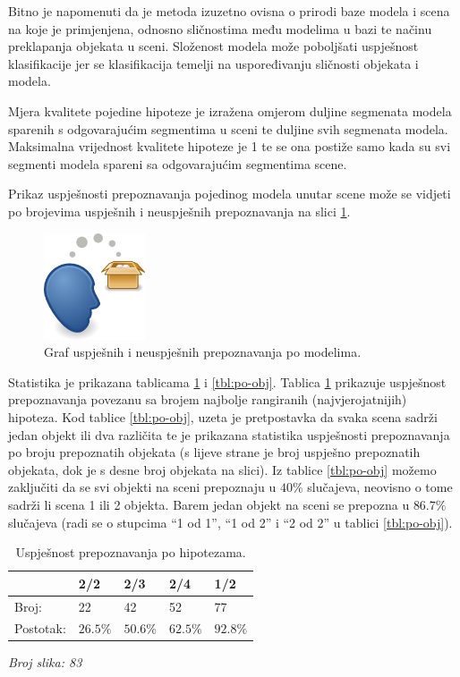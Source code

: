 \documentclass[lmodern, utf8, seminar, numeric]{fer}
\begin{document}
Bitno je napomenuti da je metoda izuzetno ovisna o prirodi baze modela i scena na koje je primjenjena, odnosno sličnostima među modelima u bazi te načinu preklapanja objekata u sceni. Složenost modela može poboljšati uspješnost klasifikacije jer se klasifikacija temelji na uspoređivanju sličnosti objekata i modela.

Mjera kvalitete pojedine hipoteze je izražena omjerom duljine segmenata modela sparenih s odgovarajućim segmentima u sceni te duljine svih segmenata modela. Maksimalna vrijednost kvalitete hipoteze je 1 te se ona postiže samo kada su svi segmenti modela spareni sa odgovarajućim segmentima scene.

Prikaz uspješnosti prepoznavanja pojedinog modela unutar scene može se vidjeti po brojevima uspješnih i neuspješnih prepoznavanja na slici \ref{fig:graf}.

\begin{figure}[htb]
\begin{center}
\includegraphics[width=3cm]{resources/img.png}
\end{center}
\caption{Graf uspješnih i neuspješnih prepoznavanja po modelima.} 
\label{fig:graf}
\end{figure}

Statistika je prikazana tablicama \ref{tbl:po-hipot} i \ref{tbl:po-obj}. Tablica \ref{tbl:po-hipot} prikazuje uspješnost prepoznavanja povezanu sa brojem najbolje rangiranih (najvjerojatnijih) hipoteza. Kod tablice \ref{tbl:po-obj}, uzeta je pretpostavka da svaka scena sadrži jedan objekt ili dva različita te je prikazana statistika uspješnosti prepoznavanja po broju prepoznatih objekata (s lijeve strane je broj uspješno prepoznatih objekata, dok je s desne broj objekata na slici). Iz tablice \ref{tbl:po-obj} možemo zaključiti da se svi objekti na sceni prepoznaju u $40\%$ slučajeva, neovisno o tome sadrži li scena 1 ili 2 objekta. Barem jedan objekt na sceni se prepozna u $86.7\%$ slučajeva (radi se o stupcima ``1 od 1'', ``1 od 2'' i ``2 od 2'' u tablici \ref{tbl:po-obj}).

\begin{table}[htb]
\centering
\caption{Uspješnost prepoznavanja po hipotezama.}
\label{tbl:po-hipot}
\begin{tabular}{l l l l l}
\toprule
 & 2/2 & 2/3 & 2/4 & 1/2\\
\midrule
Broj: & 22 & 42 & 52 & 77\\
Postotak: & $26.5\%$ & $50.6\%$ & $62.5\%$ & $92.8\%$\\
\bottomrule
\end{tabular}
\end{table}
\emph{Broj slika: 83}
\end{document}
